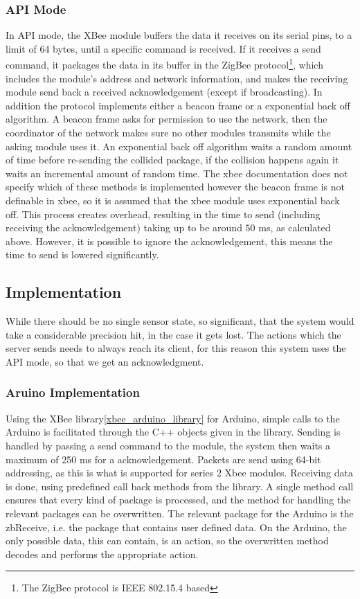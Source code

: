\subsubsection{API Mode}
In API mode, the XBee module buffers the data it receives on its serial pins, to a limit of 64 bytes, until a specific command is received. If it receives a send command, it packages the data in its buffer in the ZigBee protocol\footnote{The ZigBee protocol is IEEE 802.15.4 based}, which includes the module's address and network information, and makes the receiving module send back a received acknowledgement (except if broadcasting). In addition the protocol implements either a beacon frame or a exponential back off algorithm. A beacon frame asks for permission to use the network, then the coordinator of the network makes sure no other modules transmits while the asking module uses it. An exponential back off algorithm waits a random amount of time before re-sending the collided package, if the collision happens again it waits an incremental amount of random time. The xbee documentation does not specify which of these methods is implemented however the beacon frame is not definable in xbee, so it is assumed that the xbee module uses exponential back off. This process creates overhead, resulting in the time to send (including receiving the acknowledgement) taking up to be around $50$ ms, as calculated above. However, it is possible to ignore the acknowledgement, this means the time to send is lowered significantly.

\subsection{Implementation}
While there should be no single sensor state, so significant, that the system would take a considerable precision hit, in the case it gets lost. The actions which the server sends needs to always reach its client, for this reason this system uses the API mode, so that we get an acknowledgment.

\subsubsection{Aruino Implementation}
Using the XBee library\cref{xbee_arduino_library} for Arduino, simple calls to the Arduino is facilitated through the C++ objects given in the library. Sending is handled by passing a send command  to the module, the system then waits a maximum of 250 ms for a acknowledgement. Packets are send using 64-bit addressing, as this is what is supported for series 2 Xbee modules.
Receiving data is done, using predefined call back methods from the library. A single method call ensures that every kind of package is processed, and the method for handling the relevant packages can be overwritten. The relevant package for the Arduino is the zbReceive, i.e. the package that contains user defined data. On the Arduino, the only possible data, this can contain, is an action, so the overwritten method decodes and performs the appropriate action.
